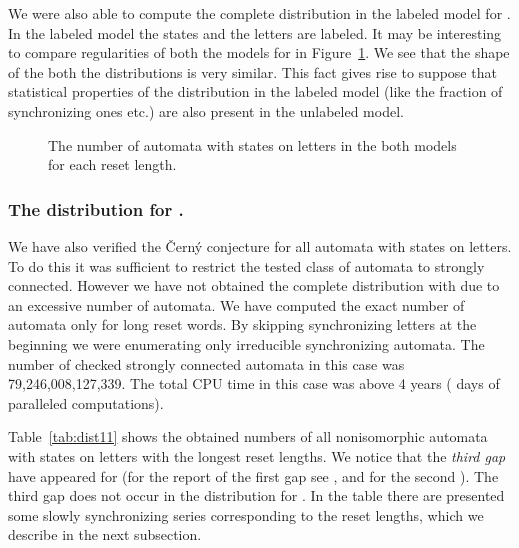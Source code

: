 \documentclass[runningheads,a4paper]{llncs}
\newcommand{\<}{\langle}
\renewcommand{\>}{\rangle}
\begin{document}
We were also able to compute the complete distribution in the labeled model for . In the labeled model the states and the letters are labeled. It may be interesting to compare regularities of both the models for  in Figure~\ref{fig:dist7}. We see that the shape of the both the distributions is very similar. This fact gives rise to suppose that statistical properties of the distribution in the labeled model (like the fraction of synchronizing ones etc.) are also present in the unlabeled model.

\begin{figure}\label{fig:dist7}
 \centering
 \caption[]{The number of automata with  states on  letters in the both models for each reset length.}
\end{figure}

\subsubsection{The distribution for .}

We have also verified the \v{C}ern\'{y} conjecture for all automata with  states on  letters. To do this it was sufficient to restrict the tested class of automata to strongly connected. However we have not obtained the complete distribution with due to an excessive number of automata. We have computed the exact number of automata only for long reset words. By skipping synchronizing letters at the beginning we were enumerating only irreducible synchronizing automata. The number of checked strongly connected automata in this case was 79,246,008,127,339. The total CPU time in this case was above 4 years ( days of paralleled computations).

Table~\ref{tab:dist11} shows the obtained numbers of all nonisomorphic automata with  states on  letters with the longest reset lengths. We notice that the \emph{third gap} have appeared for  (for the report of the first gap see \cite{Tr2006}, and for the second \cite{AGV2010}). The third gap does not occur in the distribution for . In the table there are presented some slowly synchronizing series corresponding to the reset lengths, which we describe in the next subsection.
\end{document}
